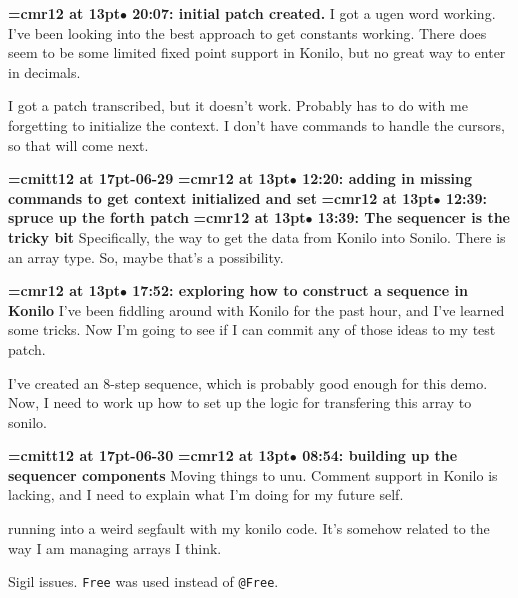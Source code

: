 {\smallskip\noindent\bf\font\titlefont=cmr12 at 13pt\titlefont $\bullet$ 20:07: initial patch created.}\smallskip
I got a ugen word working. I've been looking into the best approach to get constants working. There does seem to be some limited fixed point support in Konilo, but no great way to enter in decimals.
\par

I got a patch transcribed, but it doesn't work. Probably has to do with me forgetting to initialize the context. I don't have commands to handle the cursors, so that will come next.
\par

{\medskip\noindent\bf\font\titlefont=cmitt12 at 17pt-06-29}\medskip
{\smallskip\noindent\bf\font\titlefont=cmr12 at 13pt\titlefont $\bullet$ 12:20: adding in missing commands to get context initialized and set}\smallskip
{\smallskip\noindent\bf\font\titlefont=cmr12 at 13pt\titlefont $\bullet$ 12:39: spruce up the forth patch}\smallskip
{\smallskip\noindent\bf\font\titlefont=cmr12 at 13pt\titlefont $\bullet$ 13:39: The sequencer is the tricky bit}\smallskip
Specifically, the way to get the data from Konilo into Sonilo. There is an array type. So, maybe that's a possibility.
\par

{\smallskip\noindent\bf\font\titlefont=cmr12 at 13pt\titlefont $\bullet$ 17:52: exploring how to construct a sequence in Konilo}\smallskip
I've been fiddling around with Konilo for the past hour, and I've learned some tricks. Now I'm going to see if I can commit any of those ideas to my test patch.
\par

I've created an 8-step sequence, which is probably good enough for this demo. Now, I need to work up how to set up the logic for transfering this array to sonilo.
\par

{\medskip\noindent\bf\font\titlefont=cmitt12 at 17pt-06-30}\medskip
{\smallskip\noindent\bf\font\titlefont=cmr12 at 13pt\titlefont $\bullet$ 08:54: building up the sequencer components}\smallskip
Moving things to unu. Comment support in Konilo is lacking, and I need to explain what I'm doing for my future self.
\par

running into a weird segfault with my konilo code. It's somehow related to the way I am managing arrays I think.
\par

Sigil issues. {\tt Free} was used instead of {\tt @Free}.
\par

